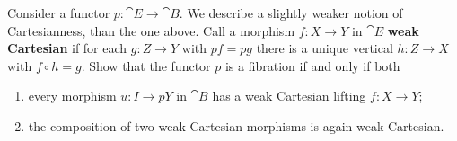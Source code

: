 \begin{exercise}
Consider a functor \(p: \cat{E} \to \cat{B}\).
We describe a slightly weaker notion of Cartesianness, than the one above.
Call a morphism \(f : X \to Y\) in \(\cat{E}\) \textbf{weak Cartesian} if for each \(g : Z \to Y\) with \(p f = p g\) there is a unique vertical \(h : Z \to X\) with \(f \circ h = g\).
Show that the functor \(p\) is a fibration if and only if both
\begin{enumerate}
\item
\label{ex:1.1.6.a}
every morphism \(u : I \to p Y\) in \(\cat{B}\) has a weak Cartesian lifting \(f : X \to Y\);
\item
\label{ex:1.1.6.b}
the composition of two weak Cartesian morphisms is again weak Cartesian.
\end{enumerate}
\end{exercise}

